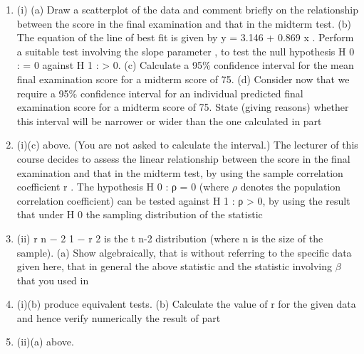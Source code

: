 \documentclass[a4paper,12pt]{article}
\begin{document}
\begin{enumerate}
\begin{enumerate}
(a) Determine the second derivative of the log-likelihood and use this, evaluated at θ̂ = 0.825, to obtain an approximation for the Cramer-Rao lower bound for this situation.
(b) Hence calculate an approximate 95\% confidence interval for $\theta$, using the asymptotic distribution of the MLE.
\item 
An extension of the genetic model suggests that the value of θ should be equal to 0.775.
(a) Carry out an appropriate $\chi^2$ test to investigate the extent to which the current data support the extended model with this value of θ (you should calculate and comment on the P -value).
(b) Comment briefly on how this relates to your approximate confidence interval in part \item (ii)(b).
\end{enumerate}
The following table gives the scores (out of 100) that 10 students obtained on a midterm test ( x ) and the final examination ( y ) in a course in statistics.
65
44
Midterm x
Final y
62
49
50
54
82
59
80
66
68
67
88
71
67
81
90
89
92
98
For these data you are given: S_{xx} = 1,760.4, S_{yy} = 2,737.6, S_{xy} = 1,529.8
\item (i)
(a) Draw a scatterplot of the data and comment briefly on the relationship between the score in the final examination and that in the midterm test.
(b) The equation of the line of best fit is given by y = 3.146 + 0.869 x . Perform a suitable test involving the slope parameter \beta, to test the null hypothesis H 0 : \beta = 0 against H 1 : \beta > 0.
(c) Calculate a 95\% confidence interval for the mean final examination score for a midterm score of 75.
(d) Consider now that we require a 95\% confidence interval for an individual predicted final examination score for a midterm score of 75.
State (giving reasons) whether this interval will be narrower or wider than the one calculated in part \item (i)(c) above. (You are not asked to calculate the interval.)
The lecturer of this course decides to assess the linear relationship between the score in the final examination and that in the midterm test, by using the sample correlation coefficient r .
The hypothesis H 0 : ρ = 0 (where $\rho$ denotes the population correlation coefficient) can be tested against H 1 : ρ > 0, by using the result that under H 0 the sampling distribution
of the statistic
\item (ii)
r n − 2
1 − r 2
is the t n-2 distribution (where n is the size of the sample).
(a) Show algebraically, that is without referring to the specific data given here, that in general the above statistic and the statistic involving $\beta$ that you used in \item (i)(b) produce equivalent tests.
(b) Calculate the value of r for the given data and hence verify numerically the result of part \item (ii)(a) above.
\newpage


\end{enumerate}
\end{document}
